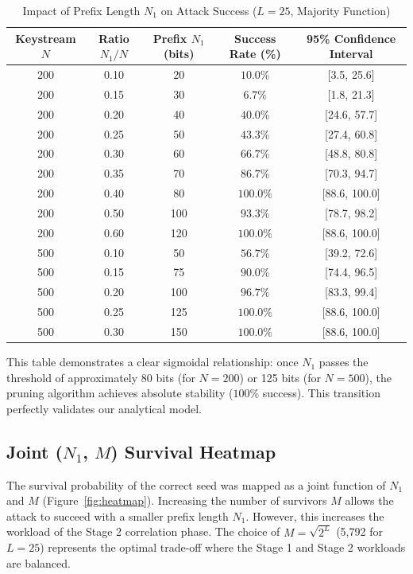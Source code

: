\begin{table}[h]
\centering
\caption{Impact of Prefix Length $N_1$ on Attack Success ($L=25$, Majority Function)}
\label{tab:n1_sweep_results}
\begin{tabular}{@{}ccccc@{}}
\toprule
\textbf{Keystream $N$} & \textbf{Ratio $N_1/N$} & \textbf{Prefix $N_1$ (bits)} & \textbf{Success Rate (\%)} & \textbf{95\% Confidence Interval} \\ \midrule
200 & 0.10 & 20  & $10.0\%$ & [3.5, 25.6] \\
200 & 0.15 & 30  & $6.7\%$  & [1.8, 21.3] \\
200 & 0.20 & 40  & $40.0\%$ & [24.6, 57.7] \\
200 & 0.25 & 50  & $43.3\%$ & [27.4, 60.8] \\
200 & 0.30 & 60  & $66.7\%$ & [48.8, 80.8] \\
200 & 0.35 & 70  & $86.7\%$ & [70.3, 94.7] \\
200 & 0.40 & 80  & $100.0\%$ & [88.6, 100.0] \\
200 & 0.50 & 100 & $93.3\%$  & [78.7, 98.2] \\
200 & 0.60 & 120 & $100.0\%$ & [88.6, 100.0] \\ \midrule
500 & 0.10 & 50  & $56.7\%$ & [39.2, 72.6] \\
500 & 0.15 & 75  & $90.0\%$ & [74.4, 96.5] \\
500 & 0.20 & 100 & $96.7\%$ & [83.3, 99.4] \\
500 & 0.25 & 125 & $100.0\%$ & [88.6, 100.0] \\
500 & 0.30 & 150 & $100.0\%$ & [88.6, 100.0] \\ \bottomrule
\end{tabular}
\end{table}

This table demonstrates a clear sigmoidal relationship: once $N_1$ passes the threshold of approximately 80 bits (for $N=200$) or 125 bits (for $N=500$), the pruning algorithm achieves absolute stability ($100\%$ success). This transition perfectly validates our analytical model.

\subsection{Joint ($N_1$, $M$) Survival Heatmap}
The survival probability of the correct seed was mapped as a joint function of $N_1$ and $M$ (Figure~\ref{fig:heatmap}). Increasing the number of survivors $M$ allows the attack to succeed with a smaller prefix length $N_1$. However, this increases the workload of the Stage 2 correlation phase. The choice of $M = \sqrt{2^L}$ (5,792 for $L=25$) represents the optimal trade-off where the Stage 1 and Stage 2 workloads are balanced.


